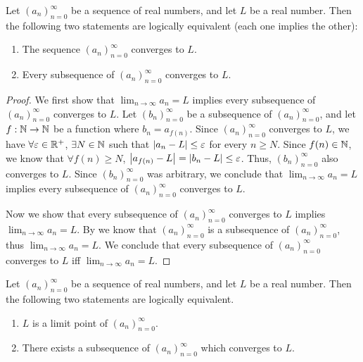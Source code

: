 \begin{prop}\label{i:6.6.5}
  Let \((a_n)_{n = 0}^\infty\) be a sequence of real numbers, and let \(L\) be a real number.
  Then the following two statements are logically equivalent (each one implies the other):
  \begin{enumerate}
    \item The sequence \((a_n)_{n = 0}^\infty\) converges to \(L\).
    \item Every subsequence of \((a_n)_{n = 0}^\infty\) converges to \(L\).
  \end{enumerate}
\end{prop}

\begin{proof}
  We first show that \(\lim_{n \to \infty} a_n = L\) implies every subsequence of \((a_n)_{n = 0}^\infty\) converges to \(L\).
  Let \((b_n)_{n = 0}^\infty\) be a subsequence of \((a_n)_{n = 0}^\infty\), and let \(f : \mathbb{N} \to \mathbb{N}\) be a function where \(b_n = a_{f(n)}\).
  Since \((a_n)_{n = 0}^\infty\) converges to \(L\), we have \(\forall \varepsilon \in \mathbb{R}^+\), \(\exists N \in \mathbb{N}\) such that \(\left\lvert a_n - L\right\rvert \leq \varepsilon\) for every \(n \geq N\).
  Since \(f(n) \in \mathbb{N}\), we know that \(\forall f(n) \geq N\), \(\left\lvert a_{f(n)} - L\right\rvert = \left\lvert b_n - L\right\rvert \leq \varepsilon\).
  Thus, \((b_n)_{n = 0}^\infty\) also converges to \(L\).
  Since \((b_n)_{n = 0}^\infty\) was arbitrary, we conclude that \(\lim_{n \to \infty} a_n = L\) implies every subsequence of \((a_n)_{n = 0}^\infty\) converges to \(L\).

  Now we show that every subsequence of \((a_n)_{n = 0}^\infty\) converges to \(L\) implies \(\lim_{n \to \infty} a_n = L\).
  By  we know that \((a_n)_{n = 0}^\infty\) is a subsequence of \((a_n)_{n = 0}^\infty\), thus \(\lim_{n \to \infty} a_n = L\).
  We conclude that every subsequence of \((a_n)_{n = 0}^\infty\) converges to \(L\) iff \(\lim_{n \to \infty} a_n = L\).
\end{proof}

\begin{prop}\label{i:6.6.6}
  Let \((a_n)_{n = 0}^\infty\) be a sequence of real numbers, and let \(L\) be a real number.
  Then the following two statements are logically equivalent.
  \begin{enumerate}
    \item \(L\) is a limit point of \((a_n)_{n = 0}^\infty\).
    \item There exists a subsequence of \((a_n)_{n = 0}^\infty\) which converges to \(L\).
  \end{enumerate}
\end{prop}

